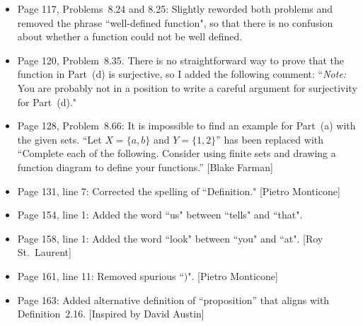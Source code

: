 \documentclass[11pt]{article}%
\begin{document}
\begin{itemize}
\item Page 117, Problems~8.24 and 8.25: Slightly reworded both problems and removed the phrase ``well-defined function", so that there is no confusion about whether a function could not be well defined.
\item Page 120, Problem~8.35. There is no straightforward way to prove that the function in Part~(d) is surjective, so I added the following comment: ``\emph{Note:} You are probably not in a position to write a careful argument for surjectivity for Part~(d)."  
\item Page 128, Problem~8.66: It is impossible to find an example for Part~(a) with the given sets.  ``Let $X=\{a,b\}$ and $Y=\{1,2\}$'' has been replaced with ``Complete each of the following. Consider using finite sets and drawing a function diagram to define your functions.'' [Blake Farman]
\item Page 131, line 7: Corrected the spelling of ``Definition." [Pietro Monticone]
\item Page 154, line 1: Added the word ``us" between ``tells" and ``that".
\item Page 158, line 1: Added the word ``look" between ``you" and ``at". [Roy St.~Laurent]
\item Page 161, line 11: Removed spurious ``$)$". [Pietro Monticone]
\item Page 163: Added alternative definition of ``proposition'' that aligns with Definition~2.16. [Inspired by David Austin]
\end{itemize}
\end{document}
